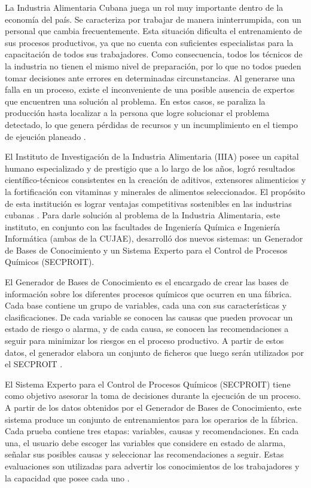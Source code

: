 La Industria Alimentaria Cubana juega un rol muy importante dentro de la economía del país. Se caracteriza por trabajar de manera ininterrumpida, con un personal que cambia frecuentemente. Esta situación dificulta el entrenamiento de sus procesos productivos, ya que no cuenta con suficientes especialistas para la capacitación de todos sus trabajadores. Como consecuencia, todos los técnicos de la industria no tienen el mismo nivel de preparación, por lo que no todos pueden tomar decisiones ante errores en determinadas circunstancias. Al generarse una falla en un proceso, existe el inconveniente de una posible ausencia de expertos que encuentren una solución al problema. En estos casos, se paraliza la producción hasta localizar a la persona que logre solucionar el problema detectado, lo que genera pérdidas de recursos y un incumplimiento en el tiempo de ejeución planeado \cite{gestorBases}.

El Instituto de Investigación de la Industria Alimentaria (IIIA) posee un capital humano especializado y de prestigio que a lo largo de los años, logró resultados científico-técnicos consistentes en la creación de aditivos, extensores alimenticios y la fortificación con vitaminas y minerales de alimentos seleccionados. El propósito de esta institución es lograr ventajas competitivas sostenibles en las industrias cubanas \cite{anaMailen}. 
Para darle solución al problema de la Industria Alimentaria, este instituto, en conjunto con las facultades de Ingeniería Química e Ingeniería Informática (ambas de la CUJAE), desarrolló dos nuevos sistemas: un Generador de Bases de Conocimiento y  un Sistema Experto para el Control de Procesos Químicos (SECPROIT).

El Generador de Bases de Conocimiento es el encargado de crear las bases de información sobre los diferentes procesos químicos que ocurren en una fábrica. Cada base contiene un grupo de variables, cada una con sus características y clasificaciones. De cada variable se conocen las causas que pueden provocar un estado de riesgo o alarma, y de cada causa, se conocen las recomendaciones a seguir para minimizar los riesgos en el proceso productivo. A partir de estos datos, el generador elabora un conjunto de ficheros que luego serán utilizados por el SECPROIT \cite{anaMailen}.

El Sistema Experto para el Control de Procesos Químicos (SECPROIT) tiene como objetivo asesorar la toma de decisiones durante la ejecución de un proceso. A partir de los datos obtenidos por el Generador de Bases de Conocimiento, este sistema produce un conjunto de entrenamientos para los operarios de la fábrica. Cada prueba contiene tres etapas: variables, causas y recomendaciones. En cada una, el usuario debe escoger las variables que considere en estado de alarma, señalar sus posibles causas y seleccionar las recomendaciones a seguir. Estas evaluaciones son utilizadas para advertir los conocimientos de los trabajadores y la capacidad que posee cada uno \cite{elena}.

